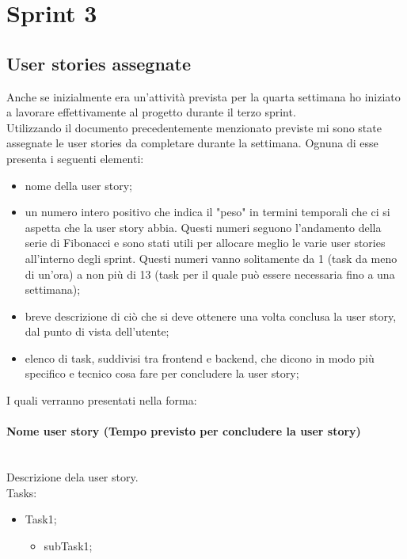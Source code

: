 
\section{Sprint 3}
\label{sec:sprint3}
\subsection{User stories assegnate}
Anche se inizialmente era un'attività prevista per la quarta settimana ho iniziato a lavorare effettivamente al progetto durante il terzo sprint. \\
Utilizzando il documento precedentemente menzionato previste mi sono state assegnate le user stories da completare durante la settimana.
\noindent Ognuna di esse presenta i seguenti elementi:
\begin{itemize}
  \item nome della user story;
  \item un numero intero positivo che indica il "peso" in termini temporali che ci si aspetta che la user story abbia. Questi numeri seguono l'andamento della serie di Fibonacci e sono stati utili per allocare meglio le varie user stories all'interno degli sprint. Questi numeri vanno solitamente da 1 (task da meno di un'ora) a non più di 13 (task per il quale può essere necessaria fino a una settimana); 
  \item breve descrizione di ciò che si deve ottenere una volta conclusa la user story, dal punto di vista dell'utente;
  \item elenco di task, suddivisi tra frontend e backend, che dicono in modo più specifico e tecnico cosa fare per concludere la user story;
\end{itemize}
I quali verranno presentati nella forma:

\paragraph{Nome user story (Tempo previsto per concludere la user story)}\mbox{} \\[\baselineskip]
\noindent Descrizione dela user story. \\

\noindent Tasks:

\begin{itemize}
  \item Task1;
  \begin{itemize}
    \item subTask1;
  \end{itemize}
\end{itemize}
\vspace*{5pt}
